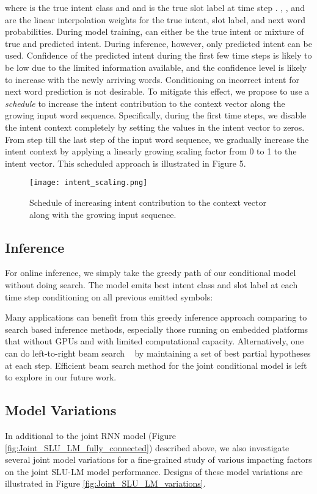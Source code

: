 \documentclass[11pt]{article}
\begin{document}
    where  is the true intent class and and  is the true slot label at time step . , , and  are the linear interpolation weights for the true intent, slot label, and next word probabilities. During model training,  can either be the true intent or mixture of true and predicted intent. During inference, however, only predicted intent can be used. Confidence of the predicted intent during the first few time steps is likely to be low due to the limited information available, and the confidence level is likely to increase with the newly arriving words. Conditioning on incorrect intent for next word prediction is not desirable. To mitigate this effect, we propose to use a \textit{schedule} to increase the intent contribution to the context vector along the growing input word sequence. Specifically, during the first  time steps, we disable the intent context completely by setting the values in the intent vector to zeros. From step  till the last step of the input word sequence, we gradually increase the intent context by applying a linearly growing scaling factor  from 0 to 1 to the intent vector. This scheduled approach is illustrated in Figure 5.
        \begin{figure}[h]
            \centering
            \texttt{[image: intent\_scaling.png]}
            \caption{{Schedule of increasing intent contribution to the context vector along with the growing input sequence.}}
            \label{fig:intent_scaling}
        \end{figure}    

\subsection{Inference}
    For online inference, we simply take the greedy path of our conditional model without doing search. The model emits best intent class and slot label at each time step conditioning on all previous emitted symbols:
            
    Many applications can benefit from this greedy inference approach comparing to search based inference methods, especially those running on embedded platforms that without GPUs and with limited computational capacity. Alternatively, one can do left-to-right beam search ~\cite{sutskever:14,chan:15} by maintaining a set of  best partial hypotheses at each step. Efficient beam search method for the joint conditional model is left to explore in our future work.

\subsection{Model Variations}
    In additional to the joint RNN model (Figure \ref{fig:Joint_SLU_LM_fully_connected}) described above, we also investigate several joint model variations for a fine-grained study of various impacting factors on the joint SLU-LM model performance. Designs of these model variations are illustrated in Figure \ref{fig:Joint_SLU_LM_variations}. 
    
\end{document}
